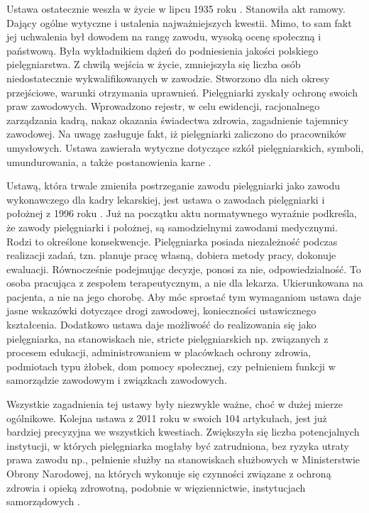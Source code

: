 \documentclass[a4paper,12pt,twoside,openright]{mwrep}
\begin{document}
Ustawa ostatecznie weszła w życie w lipcu 1935 roku \cite{usta}. Stanowiła akt ramowy. Dający ogólne wytyczne i ustalenia najważniejszych kwestii. Mimo, to sam fakt jej uchwalenia był dowodem na rangę zawodu, wysoką ocenę społeczną i państwową. Była wykładnikiem dążeń do podniesienia jakości polskiego pielęgniarstwa. Z chwilą wejścia w życie, zmniejszyła się liczba osób niedostatecznie wykwalifikowanych w zawodzie. Stworzono dla nich okresy przejściowe, warunki otrzymania uprawnień. Pielęgniarki zyskały ochronę swoich praw zawodowych. Wprowadzono rejestr, w celu ewidencji, racjonalnego zarządzania kadrą, nakaz okazania świadectwa zdrowia, zagadnienie tajemnicy zawodowej. Na uwagę zasługuje fakt, iż pielęgniarki zaliczono do pracowników umysłowych. Ustawa zawierała wytyczne dotyczące szkół pielęgniarskich, symboli, umundurowania, a także postanowienia karne \cite{1935}.

Ustawą, która trwale zmieniła postrzeganie zawodu pielęgniarki jako zawodu wykonawczego dla kadry lekarskiej, jest ustawa o zawodach pielęgniarki i położnej z 1996 roku \cite{1996}. Już na początku aktu normatywnego wyraźnie podkreśla, że zawody pielęgniarki i położnej, są samodzielnymi zawodami medycznymi. Rodzi to określone konsekwencje. Pielęgniarka posiada niezależność podczas realizacji zadań, tzn. planuje pracę własną, dobiera metody pracy, dokonuje ewaluacji. Równocześnie podejmując decyzje, ponosi za nie, odpowiedzialność. To osoba pracująca z zespołem terapeutycznym, a nie dla lekarza. Ukierunkowana na pacjenta, a nie na jego chorobę. Aby móc sprostać tym wymaganiom ustawa daje jasne wskazówki dotyczące drogi zawodowej, konieczności ustawicznego kształcenia. Dodatkowo ustawa daje możliwość do realizowania się jako pielęgniarka, na stanowiskach nie, stricte pielęgniarskich np. związanych z procesem edukacji, administrowaniem w placówkach ochrony zdrowia, podmiotach typu żłobek, dom pomocy społecznej, czy pełnieniem funkcji w samorządzie zawodowym i związkach zawodowych.

Wszystkie zagadnienia tej ustawy były niezwykle ważne, choć w dużej mierze ogólnikowe. Kolejna ustawa z 2011 roku w swoich 104 artykułach, jest już bardziej precyzyjna we wszystkich kwestiach. Zwiększyła się liczba potencjalnych instytucji, w których pielęgniarka mogłaby być zatrudniona, bez ryzyka utraty prawa zawodu np., pełnienie służby na stanowiskach służbowych w Ministerstwie Obrony Narodowej, na których wykonuje się czynności związane z ochroną zdrowia i opieką zdrowotną, podobnie w więziennictwie, instytucjach samorządowych \cite{2011}. 
\end{document}
